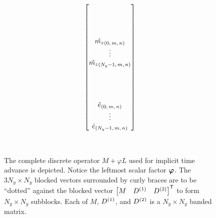 \begin{sidewaysfigure}
{{\begin{minipage}[c]{\textwidth}
\begin{align*}
\begin{bmatrix}
\\%
\\%
\\%
\\%
  \hat{\mz}_{\left(0,\,m,\,n\right)} \\
  \vdots \\
  \hat{\mz}_{\left(N_y-1,\,m,\,n\right)} \\
\\%
\\%
\\%
\\%
  \hat{e}_{\left(0,\,m,\,n\right)} \\
  \vdots \\
  \hat{e}_{\left(N_y-1,\,m,\,n\right)} \\
%
\end{bmatrix}
\end{align*}
\end{minipage}}}  %
\vspace{2em}
\\
\caption[The discrete operator $M+\varphi{}L$ used for implicit time advance]
{
    The complete discrete operator $M+\varphi{}L$ used for implicit time advance is
    depicted.  Notice the leftmost scalar factor $\bm{\varphi}$.  The $3 N_y \times
    N_y$ blocked vectors surrounded by curly braces are to be ``dotted'' against
    the blocked vector $ {\begin{bmatrix} M & D^{(1)} & D^{(2)} \end{bmatrix}}^{\mathsf{T}} $
    to form $N_y \times N_y$ subblocks.  Each of $M$, $D^{(1)}$, and $D^{(2)}$ is a
    $N_y \times N_y$ banded matrix. 
}
\label{fig:discreteimplicitop}
\end{sidewaysfigure}


